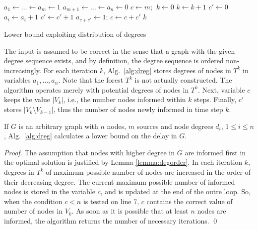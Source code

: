 
\begin{algorithm}
$a_1\leftarrow\dots\leftarrow a_{m}\leftarrow 1$\;%
$a_{m+1}\leftarrow\dots\leftarrow a_{n}\leftarrow 0$\;%
$c\leftarrow m$;%
$~k\leftarrow 0$\;
 {
$k\leftarrow k+1$\;
$c'\leftarrow 0$\;
 {
	 {
		$a_i\leftarrow a_i + 1$\;
		$c'\leftarrow c' + 1$\;
		 {
			$a_{c+c'}\leftarrow 1$; 
		}
	}
}
$c\leftarrow c + c'$\;
}
\Return $k$\;
 \caption{Lower bound exploiting distribution of degrees}
\label{alg:dreg}
\end{algorithm}

The input is assumed to be correct in the sense that a graph with the given degree sequence exists, and by definition, the degree sequence is ordered non-increasingly.
For each iteration $k$, Alg.~\ref{alg:dreg} stores degrees of nodes in $T^k$ in variables $a_1,\dots,a_n$.
Note that the forest $T^k$ is not actually constructed. 
The algorithm operates merely with potential degrees of nodes in $T^k$.
Next, variable $c$ keeps the value $|V_k|$, i.e., the number nodes informed within $k$ steps.
Finally, $c'$ stores $|V_k\setminus V_{k-1}|$, thus the number of nodes newly informed in time step $k$.

\begin{proposition}
If $G$ is an arbitrary graph with $n$ nodes, $m$ sources and node degrees $d_i$, $1\leq i\leq n$, Alg.~\ref{alg:dreg} calculates a lower bound on the delay in $G$.
\end{proposition}
\begin{proof}
The assumption that nodes with higher degree in $G$ are informed first in the optimal solution is justified by Lemma \ref{lemma:degorder}.
In each iteration $k$, degrees in $T^k$ of maximum possible number of nodes are increased in the order of their decreasing degree.
The current maximum possible number of informed nodes is stored in the variable $c$, and is updated at the end of the outre loop.
So, when the condition $c<n$ is tested on line 7, $c$ contains the correct value of number of nodes in $V_k$.
As soon as it is possible that at least $n$ nodes are informed, the algorithm returns the number of necessary iterations.
\qed
\end{proof}

